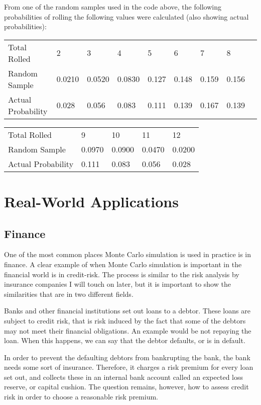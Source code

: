 \documentclass{article}
\begin{document}
From one of the random samples used in the code above, the following probabilities of rolling the following values were calculated (also showing actual probabilities):

\begin{table}[h]
\begin{tabular}{l l l l l l l l l}
Total Rolled & 2 & 3 & 4 & 5 & 6 & 7 & 8 \\
Random Sample & 0.0210 & 0.0520 & 0.0830 & 0.127 & 0.148 & 0.159 & 0.156 \\
Actual Probability & 0.028 & 0.056 & 0.083 & 0.111 & 0.139 & 0.167 & 0.139 \\
\end{tabular}
\end{table}

\begin{table}[h]
\begin{tabular}{l l l l l}
Total Rolled & 9 & 10 & 11 & 12 \\
Random Sample &0.0970 & 0.0900 & 0.0470 & 0.0200 \\
Actual Probability &0.111 & 0.083 & 0.056 & 0.028 \\
\end{tabular}
\end{table}

\pagebreak

\section{Real-World Applications}
\subsection{Finance}
\hspace{4ex} One of the most common places Monte Carlo simulation is used in practice is in finance. A clear example of when Monte Carlo simulation is important in the financial world is in credit-risk. The process is similar to the risk analysis by insurance companies I will touch on later, but it is important to show the similarities that are in two different fields.

Banks and other financial institutions set out loans to a debtor. These loans are subject to credit risk, that is risk induced by the fact that some of the debtors may not meet their ﬁnancial obligations. An example would be not repaying the loan. When this happens, we can say that the debtor defaults, or is in default.

In order to prevent the defaulting debtors from bankrupting the bank, the bank needs some sort of insurance. Therefore, it charges a risk premium for every loan set out, and collects these in an internal bank account called an expected loss reserve, or capital cushion. The question remains, however, how to assess credit risk in order to choose a reasonable risk premium. \\
\end{document}
